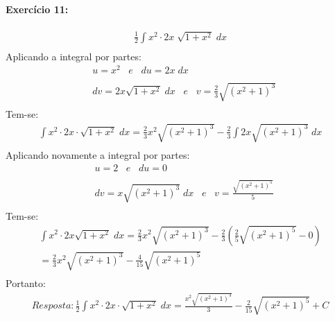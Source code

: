 \documentclass[12pt]{article}
\begin{document}
\paragraph{Exercício 11:}
\begin{align*}
\frac{1}{2}\int x^{2}\cdot 2x\;\sqrt{1+x^{2}}\; dx\\
\end{align*}
Aplicando a integral por partes:
\begin{align*}
&u = x^{2} \;\;\;e\;\;\; du = 2x\;dx\\ \\
&dv=2x\sqrt{1+x^{2}}\;dx \;\;\;e\;\;\; v=\frac{2}{3}\sqrt{\left ( x^{2}+1 \right )^{3}}\\
\end{align*}
Tem-se:
\begin{align*}
\int x^{2}\cdot 2x\cdot\sqrt{1+x^{2}}\; dx = \frac{2}{3}x^{2}\sqrt{\left ( x^{2}+1 \right )^{3}}-\frac{2}{3}\int 2x\sqrt{\left ( x^{2} +1\right )^{3}}\;dx\\
\end{align*}
Aplicando novamente a integral por partes:
\begin{align*}
&u = 2 \;\;\;e\;\;\; du = 0\\ \\
&dv = x\sqrt{\left ( x^{2}+1 \right )^{3}}\;dx \;\;\;e\;\;\; v=\frac{\sqrt{\left ( x^{2}+1 \right )^{5}}}{5}\\
\end{align*}
Tem-se:
\begin{align*}
\int x^{2}\cdot 2x\sqrt{1+x^{2}}\;dx = \frac{2}{3}x^{2}\sqrt{\left ( x^{2}+1 \right )^{3}}-\frac{2}{3}\left ( \frac{2}{5}\sqrt{\left ( x^{2}+1 \right )^{5}}-0 \right )\\
=\frac{2}{3}x^{2}\sqrt{\left ( x^{2}+1 \right )^{3}}-\frac{4}{15}\sqrt{\left ( x^{2}+1 \right )^{5}}\\
\end{align*}
Portanto:
\begin{align*}
Resposta: \frac{1}{2}\int x^{2}\cdot 2x\cdot\sqrt{1+x^{2}}\; dx = \frac{x^{2}\sqrt{\left ( x^{2}+1 \right )^{3}}}{3}-\frac{2}{15}\sqrt{\left ( x^{2}+1 \right )^{5}}+C\\
\end{align*}

\end{document}
